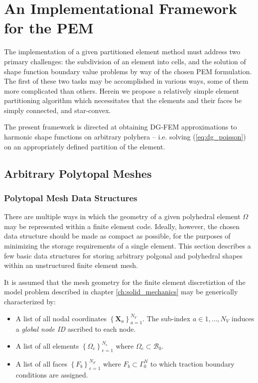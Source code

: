 \chapter{An Implementational Framework for the PEM} \label{ch:implementation}
%
The implementation of a given partitioned element method must address two primary challenges: the subdivision of an element into cells, and the solution of shape function boundary value problems by way of the chosen PEM formulation. The first of these two tasks may be accomplished in various ways, some of them more complicated than others. Herein we propose a relatively simple element partitioning algorithm which necessitates that the elements and their faces be simply connected, and star-convex.

The present framework is directed at obtaining DG-FEM approximations to harmonic shape functions on arbitrary polyhera -- i.e. solving (\ref{eq:dg_poisson}) on an appropriately defined partition of the element.

\section{Arbitrary Polytopal Meshes}



\subsection{Polytopal Mesh Data Structures}

	There are multiple ways in which the geometry of a given polyhedral element $\Omega$ may be represented within a finite element code. Ideally, however, the chosen data structure should be made as compact as possible, for the purposes of minimizing the storage requirements of a single element. This section describes a few basic data structures for storing arbitrary polgonal and polyhedral shapes within an unstructured finite element mesh.
	
	It is assumed that the mesh geometry for the finite element discretiztion of the model problem described in chapter \ref{ch:solid_mechanics} may be generically characterized by:
	\begin{itemize}
		\item A list of all nodal coordinates $\left\{ \mathbf{X}_a \right\}_{a=1}^{N_V}$. The sub-index $a \in 1, \ldots, N_V$ induces a \textit{global node ID} ascribed to each node.
		\item A list of all elements $\left\{ \Omega_{e} \right\}_{e = 1}^{N_e}$ where $\Omega_{e} \subset \mathcal{B}_0$.
		\item A list of all faces $\left\{ F_{b} \right\}_{e = 1}^{N_F}$ where $F_{b} \subset \Gamma^N_0$ to which traction boundary conditions are assigned.
	\end{itemize}
	
